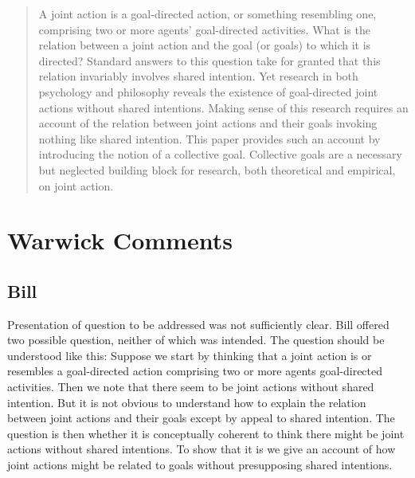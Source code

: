 \documentclass[12pt,a4paper]{extarticle}
\begin{document}
\setlength\footnotesep{1em}


\maketitle

\begin{abstract}
A joint action is a goal-directed action, or something resembling one, comprising two or more agents' goal-directed activities.  
What is the relation between a joint action and the goal (or goals) to which it is directed?  
Standard answers to this question take for granted that  this relation invariably involves shared intention.  
Yet research in both psychology and philosophy reveals the existence of goal-directed joint actions without shared intentions.
Making sense of this research requires an account of the relation between joint actions and their goals invoking nothing like shared intention.
This paper provides such an account by introducing the notion of a collective goal.
Collective goals are a necessary but neglected building block for research, both theoretical and empirical, on joint action.



\end{abstract}


\section{Warwick Comments}

\subsection{Bill}
Presentation of question to be addressed was not sufficiently clear.
Bill offered two possible question, neither of which was intended.
The question should be understood like this:
Suppose we start by thinking that a joint action is or resembles a goal-directed action comprising two or more agents goal-directed activities.  
Then we note that there seem to be joint actions without shared intention.
But it is not obvious to understand how to explain the relation between joint actions and their goals except by appeal to shared intention.
The question is then whether it is conceptually coherent to think there might be joint actions without shared intentions.
To show that it is we give an account of how joint actions might be related to goals without presupposing shared intentions.
\end{document}
